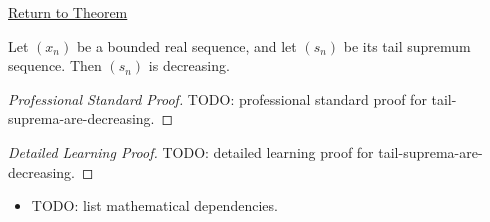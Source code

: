 \newpage
{}
\label{prf:tail-suprema-are-decreasing}

\begin{remark*}[Return]
\hyperref[thm:tail-suprema-are-decreasing]{Return to Theorem}
\end{remark*}

\begin{theorem*}
Let $(x_n)$ be a bounded real sequence, and let $(s_n)$ be its tail
supremum sequence. Then $(s_n)$ is decreasing.

\smallskip
\noindent
\end{theorem*}

\begin{proof}[Professional Standard Proof]
\LRAProofBodyStart
TODO: professional standard proof for tail-suprema-are-decreasing.
\end{proof}

\begin{proof}[Detailed Learning Proof]
\LRAProofBodyStart
TODO: detailed learning proof for tail-suprema-are-decreasing.
\end{proof}

\begin{remark*}
\end{remark*}

\begin{dependencies}
\begin{itemize}
  \item TODO: list mathematical dependencies.
\end{itemize}
\end{dependencies}

\clearpage
